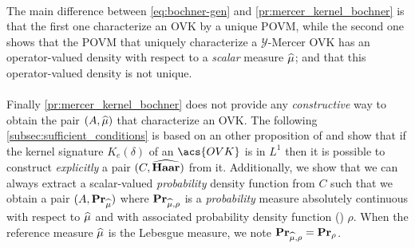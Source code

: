 \paragraph{}
The main difference between \cref{eq:bochner-gen} and \cref{pr:mercer_kernel_bochner} is that the first one characterize an \acs{OVK} by a unique \acf{POVM}, while the second one shows that the \acs{POVM} that uniquely characterize a $\mathcal{Y}$-Mercer \acs{OVK} has an operator-valued density with respect to a \emph{scalar} measure $\widehat{\mu}$; and that this operator-valued density is not unique.
\paragraph{}
Finally \cref{pr:mercer_kernel_bochner} does not provide any \emph{constructive} way to obtain the pair $(A,\widehat{\mu})$ that characterize an \acs{OVK}.
The following \cref{subsec:sufficient_conditions} is based on an other proposition of \citeauthor{carmeli2006vector} and show that if the kernel signature $K_e(\delta)$ of an $\acs{OVK}$ is in $L^1$ then it is possible to construct \emph{explicitly} a pair $(C,\widehat{\mathbf{Haar}})$ from it. Additionally, we show that we can always extract a scalar-valued \emph{probability} density function from $C$ such that we obtain a pair $(A,{\mathbf{{Pr}}}_{\widehat{\mu}})$ where ${\mathbf{{Pr}}}_{\widehat{\mu},\rho}$ is a \emph{probability} measure absolutely continuous with respect to $\widehat{\mu}$ and with associated probability density function (\pdf) $\rho$. When the reference measure $\widehat{\mu}$ is the Lebesgue measure, we note ${\mathbf{{Pr}}}_{\widehat{\mu},\rho}={\mathbf{{Pr}}}_\rho$.

